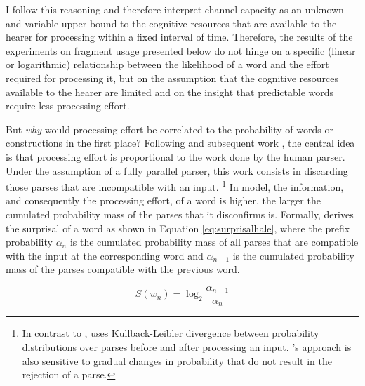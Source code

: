 %
I follow this reasoning and therefore interpret channel capacity as an unknown and variable upper bound to the cognitive resources that are available to the hearer for processing within a fixed interval of time. Therefore, the results of the experiments on fragment usage presented below do not hinge on a specific (linear or logarithmic) relationship between the likelihood of a word and the effort required for processing it, but on the assumption that the cognitive resources available to the hearer are limited and on the insight that predictable words require less processing effort.

But \textit{why} would processing effort be correlated to the probability of words or constructions in the first place? Following \citet{hale2001} and subsequent work \citep{levy2005, hale2006, levy2008}, the central idea is that processing effort is proportional to the work done by the human parser. Under the assumption of a fully parallel parser, this work consists in discarding those parses that are incompatible with an input.%
%
\footnote{In contrast to \citet{hale2001}, \citet{levy2008} uses Kullback-Leibler divergence between probability distributions over parses before and after processing an input. \citeauthor{levy2008}'s approach is also sensitive to gradual changes in probability that do not result in the rejection of a parse.}\afterfn%
%
In  model, the information, and consequently the processing effort, of a word is higher, the larger the cumulated probability mass of the parses that it disconfirms is. Formally, \citet[162]{hale2001} derives the surprisal of a word as shown in Equation \ref{eq:surprisalhale}, where the prefix probability $\alpha_n$ is the cumulated probability mass of all parses that are compatible with the input at the corresponding word and $\alpha_{n-1}$ is the cumulated probability mass of the parses compatible with the previous word.

\begin{equation}
 \displaystyle S(w_n) = \log_2 \frac{\alpha_{n-1}}{\alpha_n} \label{eq:surprisalhale}
\end{equation}


